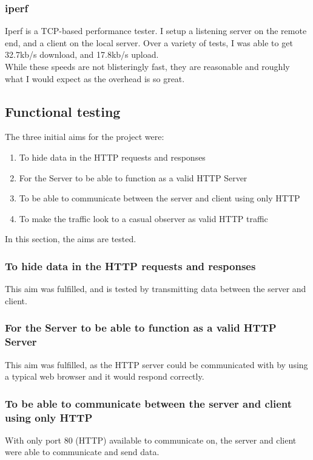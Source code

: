 \subsubsection{iperf}
Iperf is a TCP-based performance tester.
I setup a listening server on the remote end, and a client on the local server.
Over a variety of tests, I was able to get 32.7kb/s download, and 17.8kb/s upload.\\
While these speeds are not blisteringly fast, they are reasonable and roughly what I would expect as the overhead is so great.

\subsection{Functional testing}
The three initial aims for the project were:
\begin{enumerate}
    \item To hide data in the HTTP requests and responses
    \item For the Server to be able to function as a valid HTTP Server
    \item To be able to communicate between the server and client using only HTTP
    \item To make the traffic look to a casual observer as valid HTTP traffic
\end{enumerate}
In this section, the aims are tested.
\subsubsection{To hide data in the HTTP requests and responses}
This aim was fulfilled, and is tested by transmitting data between the server and client.

\subsubsection{For the Server to be able to function as a valid HTTP Server}
This aim was fulfilled, as the HTTP server could be communicated with by using a typical web browser and it would respond correctly.

\subsubsection{To be able to communicate between the server and client using only HTTP}
With only port 80 (HTTP) available to communicate on, the server and client were able to communicate and send data.

